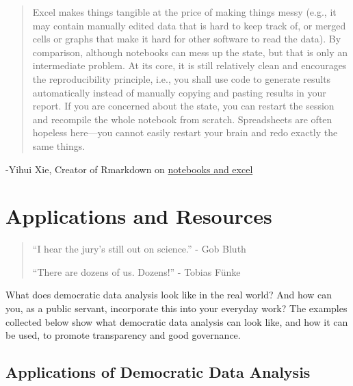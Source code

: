 \documentclass[
]{book}
\begin{document}
\begin{quote}
Excel makes things tangible at the price of making things messy (e.g., it may contain manually edited data that is hard to keep track of, or merged cells or graphs that make it hard for other software to read the data). By comparison, although notebooks can mess up the state, but that is only an intermediate problem. At its core, it is still relatively clean and encourages the reproducibility principle, i.e., you shall use code to generate results automatically instead of manually copying and pasting results in your report. If you are concerned about the state, you can restart the session and recompile the whole notebook from scratch. Spreadsheets are often hopeless here---you cannot easily restart your brain and redo exactly the same things.
\end{quote}

-Yihui Xie, Creator of Rmarkdown on \href{https://yihui.org/en/2018/09/notebook-war/}{notebooks and excel}

\hypertarget{applications-and-resources}{%
\chapter{Applications and Resources}\label{applications-and-resources}}

\begin{quote}
``I hear the jury's still out on science.'' - Gob Bluth

``There are dozens of us. Dozens!'' - Tobias Fünke
\end{quote}

What does democratic data analysis look like in the real world? And how can you, as a public servant, incorporate this into your everyday work? The examples collected below show what democratic data analysis can look like, and how it can be used, to promote transparency and good governance.

\hypertarget{applications-of-democratic-data-analysis}{%
\section{Applications of Democratic Data Analysis}\label{applications-of-democratic-data-analysis}}
\end{document}
